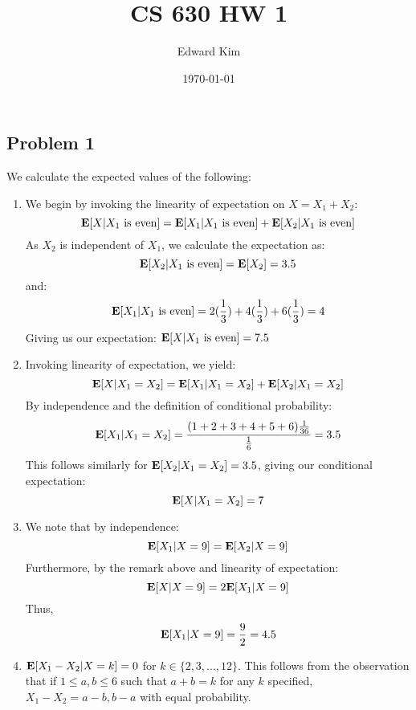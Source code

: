 \documentclass[12pt]{article}%
\begin{document}
\title{CS 630 HW 1}
\author{Edward Kim}
\date{\today}
\maketitle

\subsection*{Problem 1}
We calculate the expected values of the following:
\begin{enumerate}
  \item We begin by invoking the linearity of expectation on $X = X_1 + X_2$:
  $${\bf E}[X | X_1 \text{ is even}] = {\bf E}[X_1|X_1 \text{ is even}] + {\bf E}[X_2 | X_1 \text{ is even} ] $$
  As $X_2$ is independent of $X_1$, we calculate the expectation as:
  $${\bf E}[X_2 | X_1 \text{ is even}] = {\bf E}[X_2] = 3.5 $$ and:
  $${\bf E}[X_1|X_1 \text{ is even}] = 2(\frac{1}{3}) +  4(\frac{1}{3}) + 6(\frac{1}{3}) = 4 $$
  Giving us our expectation: ${\bf E}[X | X_1 \text{ is even}] = 7.5$
  \item Invoking linearity of expectation, we yield:
  $${\bf E}[X | X_1 = X_2] = {\bf E}[X_1 | X_1 = X_2] + {\bf E}[X_2 | X_1 = X_2]$$
  By independence and the definition of conditional probability:
  $${\bf E}[X_1 | X_1 = X_2] =\frac{(1+2+3+4+5+6)\frac{1}{36}}{\frac{1}{6}} = 3.5$$
  This follows similarly for ${\bf E}[X_2 | X_1 = X_2] = 3.5$, giving our conditional expectation:
  $${\bf E}[X | X_1 = X_2] = 7$$
  \item We note that by independence: $$ {\bf E}[X_1 | X = 9] =  {\bf E}[X_2 | X = 9]$$
  Furthermore, by the remark above and linearity of expectation: $$ {\bf E}[X| X= 9] = 2{\bf E}[X_1|X=9]$$ Thus,
  $$ {\bf E}[X_1|X=9] = \frac{9}{2} = 4.5$$
  \item ${\bf E}[X_1 - X_2 | X = k] = 0$ for $k \in \{2,3,...,12\}$. This follows from the observation that if $1 \leq a,b \leq 6 $ such that $a+b = k$ for any $k$ specified, $X_1 - X_2 = a-b,b-a$ with equal probability.
\end{enumerate}
\end{document}
